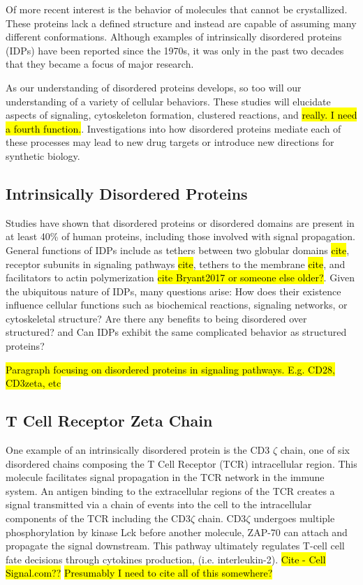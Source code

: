 \documentclass[../AdvancementSummary.tex]{subfiles}
\begin{document}
Of more recent interest is the behavior of molecules that cannot be crystallized. These proteins lack a defined structure and instead are capable of assuming many different conformations. Although examples of intrinsically disordered proteins (IDPs) have been reported since the 1970s, it was only in the past two decades that they became a focus of major research. \cite{Dunker2008} 

As our understanding of disordered proteins develops, so too will our understanding of a variety of cellular behaviors. These studies will elucidate aspects of signaling, cytoskeleton formation, clustered reactions, and \hl{really.  I need a fourth function.}. Investigations into how disordered proteins mediate each of these processes may lead to new drug targets or introduce new directions for synthetic biology.


\subsection{Intrinsically Disordered Proteins}

Studies have shown that disordered proteins or disordered domains are present in at least 40\% of human proteins, including those involved with signal propagation.\cite{Tompa2012} General functions of IDPs include as tethers between two globular domains \hl{cite}, receptor subunits in signaling pathways \hl{cite}, tethers to the membrane \hl{cite}, and facilitators to actin polymerization \hl{cite Bryant2017 or someone else older?}. Given the ubiquitous nature of IDPs, many questions arise: How does their existence influence cellular functions such as biochemical reactions, signaling networks, or cytoskeletal structure?  Are there any benefits to being disordered over structured? and Can IDPs exhibit the same complicated behavior as structured proteins?

\hl{Paragraph focusing on disordered proteins in signaling pathways. E.g. CD28, CD3zeta, etc}



\subsection{T Cell Receptor Zeta Chain}

One example of an intrinsically disordered protein is the CD3 $\zeta$ chain, one of six disordered chains composing the T Cell Receptor (TCR) intracellular region. This molecule facilitates signal propagation in the TCR network in the immune system.  An antigen binding to the extracellular regions of the TCR creates a signal transmitted via a chain of events into the cell to the intracellular components of the TCR including the CD3$\zeta$ chain.  CD3$\zeta$ undergoes multiple phosphorylation by kinase Lck before another molecule, ZAP-70 can attach and propagate the signal downstream. This pathway ultimately regulates T-cell cell fate decisions through cytokines production, (i.e. interleukin-2). \hl{Cite - Cell Signal.com??} \hl{Presumably I need to cite all of this somewhere?}
\end{document}
